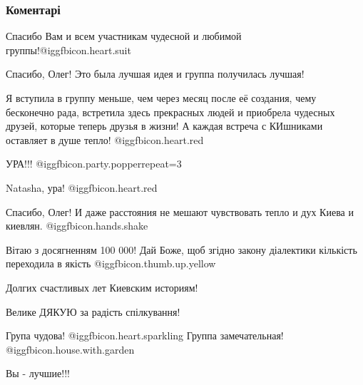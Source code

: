 
 
 
 
 
\subsubsection{Коментарі}

\begin{itemize} %
Спасибо Вам и всем участникам чудесной и любимой группы!@igg{fbicon.heart.suit}


Спасибо, Олег! Это была лучшая идея и группа получилась лучшая!

Я вступила в группу меньше, чем через месяц после её создания, чему бесконечно
рада, встретила здесь прекрасных людей и приобрела чудесных
друзей, которые теперь друзья в жизни! А каждая встреча с
КИшниками оставляет в душе тепло! @igg{fbicon.heart.red}

УРА!!!  @igg{fbicon.party.popper}{repeat=3} 

\begin{itemize} %


Natasha, ура! @igg{fbicon.heart.red}
\end{itemize} %

Спасибо, Олег! И даже расстояния не мешают чувствовать тепло и дух Киева и киевлян.  @igg{fbicon.hands.shake} 

Вітаю з досягненням 100 000! Дай Боже, щоб згідно закону діалектики кількість переходила в якість @igg{fbicon.thumb.up.yellow} 

Долгих счастливых лет Киевским историям!

Велике ДЯКУЮ за радість спілкування!

Група чудова! @igg{fbicon.heart.sparkling}  Группа замечательная! @igg{fbicon.house.with.garden} 

Вы - лучшие!!!


\end{itemize}
